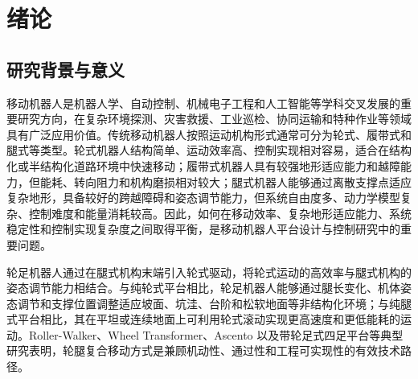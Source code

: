 \documentclass[type=bachelor]{bithesis}
\begin{document}
\MakeCover

\begin{blindPeerReview}
  \newpage
\end{blindPeerReview}
% 

\frontmatter


\MakeTOC

\mainmatter

% 
% 

\chapter{绪论}

\section{研究背景与意义}
移动机器人是机器人学、自动控制、机械电子工程和人工智能等学科交叉发展的重要研究方向，在复杂环境探测、灾害救援、工业巡检、协同运输和特种作业等领域具有广泛应用价值\cite{siegwart2011introduction,corke2017robotics}。传统移动机器人按照运动机构形式通常可分为轮式、履带式和腿式等类型。轮式机器人结构简单、运动效率高、控制实现相对容易，适合在结构化或半结构化道路环境中快速移动；履带式机器人具有较强地形适应能力和越障能力，但能耗、转向阻力和机构磨损相对较大；腿式机器人能够通过离散支撑点适应复杂地形，具备较好的跨越障碍和姿态调节能力，但系统自由度多、动力学模型复杂、控制难度和能量消耗较高。因此，如何在移动效率、复杂地形适应能力、系统稳定性和控制实现复杂度之间取得平衡，是移动机器人平台设计与控制研究中的重要问题。

轮足机器人通过在腿式机构末端引入轮式驱动，将轮式运动的高效率与腿式机构的姿态调节能力相结合。与纯轮式平台相比，轮足机器人能够通过腿长变化、机体姿态调节和支撑位置调整适应坡面、坑洼、台阶和松软地面等非结构化环境；与纯腿式平台相比，其在平坦或连续地面上可利用轮式滚动实现更高速度和更低能耗的运动。Roller-Walker、Wheel Transformer、Ascento 以及带轮足式四足平台等典型研究表明，轮腿复合移动方式是兼顾机动性、通过性和工程可实现性的有效技术路径\cite{endo1999roller,kim2014wheel,klemm2019ascento,bjelonic2021whole,grandia2019feedback}。
\end{document}
